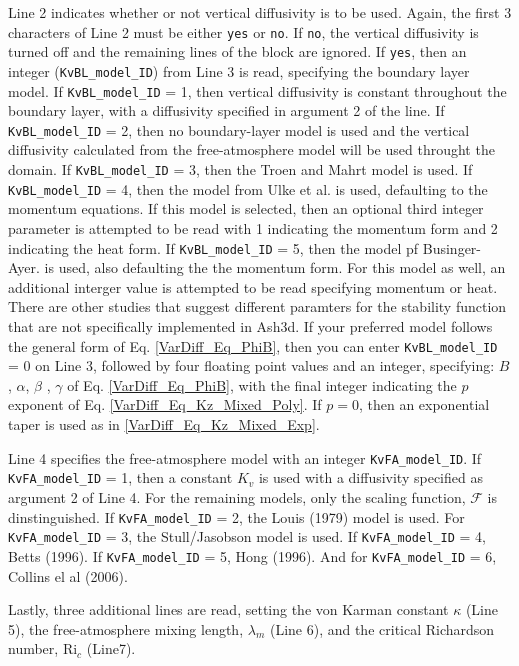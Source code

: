 Line 2 indicates whether or not vertical diffusivity is to be used.
Again, the first 3 characters of Line 2 must be either \texttt{yes} or \texttt{no}.
If \texttt{no}, the vertical diffusivity is turned off and the remaining lines of the
block are ignored.
If \texttt{yes}, then an integer (\texttt{KvBL\_model\_ID}) from Line 3 is read,
specifying the boundary layer model.
If \texttt{KvBL\_model\_ID} = 1, then vertical diffusivity is constant throughout the boundary layer,
with a diffusivity specified in argument 2 of the line.
If \texttt{KvBL\_model\_ID} = 2, then no boundary-layer model is used and the vertical diffusivity
calculated from the free-atmosphere model will be used throught the domain.
If \texttt{KvBL\_model\_ID} = 3, then the Troen and Mahrt model is used.
If \texttt{KvBL\_model\_ID} = 4, then the model from Ulke et al. is used, defaulting to the
momentum equations. If this model is selected, then an optional third integer parameter
is attempted to be read with 1 indicating the momentum form and 2 indicating the heat form.
If \texttt{KvBL\_model\_ID} = 5, then the model pf Businger-Ayer. is used, also defaulting
the the momentum form. For this model as well, an additional interger value is attempted
to be read specifying momentum or heat.
There are other studies that suggest different paramters for the stability function that
are not specifically implemented in Ash3d. If your preferred model follows the general
form of Eq. \ref{VarDiff_Eq_PhiB}, then you can enter \texttt{KvBL\_model\_ID} = 0 on Line 3,
followed by four floating point values and an integer, specifying:
$B$,  $\alpha$,  $\beta$ , $\gamma$ of Eq. \ref{VarDiff_Eq_PhiB}, with the final integer indicating
the $p$ exponent of Eq. \ref{VarDiff_Eq_Kz_Mixed_Poly}. If $p=0$, then an exponential taper is
used as in \ref{VarDiff_Eq_Kz_Mixed_Exp}.

Line 4 specifies the free-atmosphere model with an integer \texttt{KvFA\_model\_ID}.
If \texttt{KvFA\_model\_ID} = 1, then a constant $K_v$ is used with a diffusivity specified
as argument 2 of Line 4. For the remaining models, only the scaling function, $\mathcal{F}$
is dinstinguished. If \texttt{KvFA\_model\_ID} = 2, the Louis (1979) model is used.
For \texttt{KvFA\_model\_ID} = 3, the Stull/Jasobson model is used.
If \texttt{KvFA\_model\_ID} = 4, Betts (1996).
If \texttt{KvFA\_model\_ID} = 5, Hong (1996). And for \texttt{KvFA\_model\_ID} = 6,  Collins el al (2006).

Lastly, three additional lines are read, setting the von Karman constant $\kappa$ (Line 5), the free-atmosphere
mixing length, $\lambda_m$ (Line 6), and the critical Richardson number, $\mathrm{Ri}_c$ (Line7).

